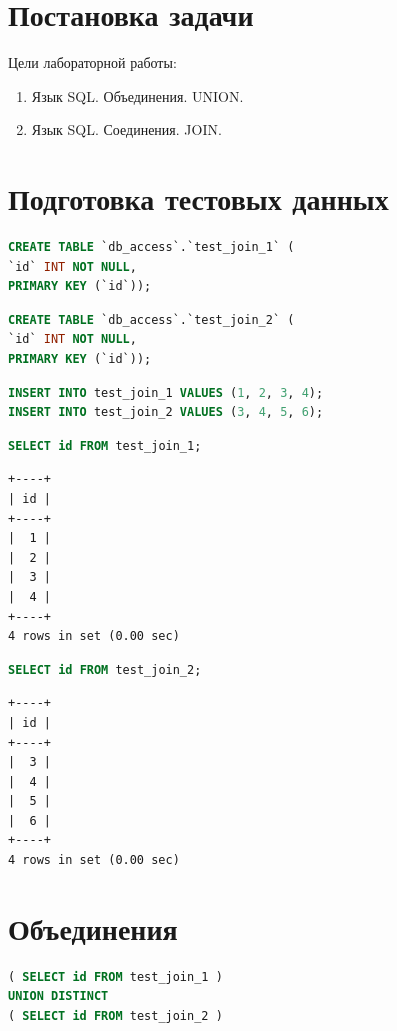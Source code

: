 \documentclass[12pt,a4paper]{article}
\begin{document}
\section{Постановка задачи}
Цели лабораторной работы:
\begin{enumerate}
    \item Язык SQL. Объединения. UNION.
    \item Язык SQL. Соединения. JOIN.
\end{enumerate}
\section{Подготовка тестовых данных}

\begin{lstlisting}[language=SQL]
CREATE TABLE `db_access`.`test_join_1` (
`id` INT NOT NULL,
PRIMARY KEY (`id`));
\end{lstlisting}

\begin{lstlisting}[language=SQL]
CREATE TABLE `db_access`.`test_join_2` (
`id` INT NOT NULL,
PRIMARY KEY (`id`));
\end{lstlisting}

\begin{lstlisting}[language=SQL]
INSERT INTO test_join_1 VALUES (1, 2, 3, 4);
INSERT INTO test_join_2 VALUES (3, 4, 5, 6);
\end{lstlisting}

\begin{lstlisting}[language=SQL]
SELECT id FROM test_join_1;
\end{lstlisting}
\begin{lstlisting}[basicstyle = \tiny\ttfamily, columns = fixed]
+----+
| id |
+----+
|  1 |
|  2 |
|  3 |
|  4 |
+----+
4 rows in set (0.00 sec)
\end{lstlisting}

\begin{lstlisting}[language=SQL]
SELECT id FROM test_join_2;
\end{lstlisting}
\begin{lstlisting}[basicstyle = \tiny\ttfamily, columns = fixed]
+----+
| id |
+----+
|  3 |
|  4 |
|  5 |
|  6 |
+----+
4 rows in set (0.00 sec)
\end{lstlisting}

\section{Объединения}
\begin{lstlisting}[language=SQL]
( SELECT id FROM test_join_1 )
UNION DISTINCT
( SELECT id FROM test_join_2 )
\end{lstlisting}
\end{document}

